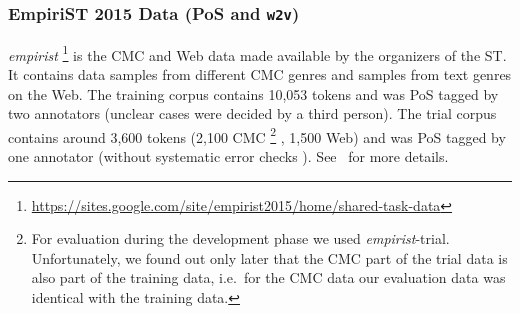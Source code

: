 \documentclass[11pt]{article}
\newcommand\wtv{\texttt{w2v}\xspace}
\begin{document}
\subsubsection{EmpiriST 2015 Data (PoS and \wtv)} %
\label{subsec:empirist}
\emph{empirist}%
\footnote{\url{https://sites.google.com/site/empirist2015/home/shared-task-data}}
is the CMC and Web data made available by the organizers of the ST.
It contains data samples from different CMC genres and samples from text genres
on the Web.
The training corpus contains 10,053 tokens and was PoS tagged by two annotators
(unclear cases were decided by a third person). 
The trial corpus contains around 3,600 tokens (2,100 CMC%
\footnote{For evaluation during the development phase we used
    \emph{empirist}-trial.
    Unfortunately, we found out only later that the CMC part of the trial data
    is also part of the training data, i.e.~for the CMC data our evaluation
    data was identical with the training data.}%
, 1,500 Web) and was PoS tagged by one annotator (without systematic error
checks%
).
See~ for more details.



\end{document}
